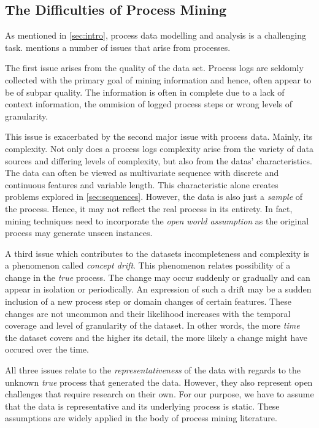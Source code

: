 \documentclass[12pt,a4paper]{report}
\begin{document}
\subsection{The Difficulties of Process Mining}
As mentioned in \autoref{sec:intro}, process data modelling and analysis is a challenging task. \citeauthor{vanderaalst_ProcessMiningManifesto_2012} mentions a number of issues that arise from processes\autocite{vanderaalst_ProcessMiningManifesto_2012}.

The first issue arises from the quality of the data set. Process logs are seldomly collected with the primary goal of mining information and hence, often appear to be of subpar quality. The information is often in complete due to a lack of context information, the ommision of logged process steps or wrong levels of granularity.

This issue is exacerbated by the second major issue with process data. Mainly, its complexity. Not only does a process logs complexity arise from the variety of data sources and differing levels of complexity, but also from the datas' characteristics. The data can often be viewed as multivariate sequence with discrete and continuous features and variable length. This characteristic alone creates problems explored in \autoref{sec:sequences}.  However, the data is also just a \emph{sample} of the process. Hence, it may not reflect the real process in its entirety. In fact, mining techniques need to incorporate the \emph{open world assumption} as the original process may generate unseen \glspl{instance}.

A third issue which contributes to the datasets incompleteness and complexity is a phenomenon called \emph{concept drift}. This phenomenon relates possibility of a change in the \emph{true} process. The change may occur suddenly or gradually and can appear in isolation or periodically. An expression of such a drift may be a sudden inclusion of a new process step or domain changes of certain features. These changes are not uncommon and their likelihood increases with the temporal coverage and level of granularity of the dataset\needscite. In other words, the more \emph{time} the dataset covers and the higher its detail, the more likely a change might have occured over the time.

All three issues relate to the \emph{representativeness} of the data with regards to the unknown \emph{true} process that generated the data. However, they also represent open challenges that require research on their own. For our purpose, we have to assume that the data is representative and its underlying process is static. These assumptions are widely applied in the body of process mining literature\needscite.
\end{document}
